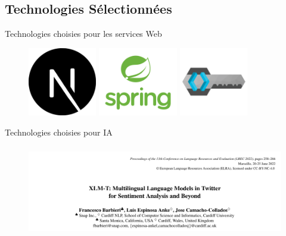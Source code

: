 \subsection{Technologies Sélectionnées}
\begin{frame}{Technologies choisies pour les services Web}
    \begin{figure}[H]
        \centering
        \begin{minipage}{0.32\textwidth}
            \centering
            \includegraphics[height=3cm]{assets/images/next.png}
        \end{minipage}%
        \hspace{0.03\textwidth}
        \begin{minipage}{0.32\textwidth}
            \centering
            \includegraphics[height=3cm]{assets/images/spring.png}
        \end{minipage}%
        \hspace{0.03\textwidth}
        \begin{minipage}{0.32\textwidth}
            \centering
            \includegraphics[height=3cm]{assets/images/keycloak.png}
        \end{minipage}

    \end{figure}
\end{frame}



\begin{frame}{Technologies choisies pour IA}
    \begin{figure}[H]
        \centering

       
            \includegraphics[height=4cm]{assets/images/ai-name.png}
    
      
    \end{figure}
\end{frame}

